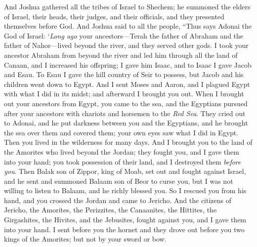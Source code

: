 \begin{biblechapter} %
 And Joshua gathered all the tribes of Israel to Shechem; he summoned the elders of Israel, their heads, their judges, and their officials, and they presented themselves before God.
\verse And Joshua said to all the people, “Thus says Adonai the God of Israel: ‘\textit{Long ago} your ancestors—Terah the father of Abraham and the father of Nahor—lived beyond the river, and they served other gods.
\verse I took your ancestor Abraham from beyond the river and led him through all the land of Canaan, and I increased his offspring; I gave him Isaac,
\verse and to Isaac I gave Jacob and Esau. To Esau I gave the hill country of Seir to possess, but Jacob and his children went down to Egypt.
\verse And I sent Moses and Aaron, and I plagued Egypt with what I did in its midst; and afterward I brought you out.
\verse When I brought out your ancestors from Egypt, you came to the sea, and the Egyptians pursued after your ancestors with chariots and horsemen to the \textit{Red Sea}.
\verse They cried out to Adonai, and he put darkness between you and the Egyptians, and he brought the sea over them and covered them; your own eyes saw what I did in Egypt. Then you lived in the wilderness for many days.
\verse And I brought you to the land of the Amorites who lived beyond the Jordan; they fought you, and I gave them into your hand; you took possession of their land, and I destroyed them \textit{before you}.
\verse Then Balak son of Zippor, king of Moab, set out and fought against Israel, and he sent and summoned Balaam son of Beor to curse you,
\verse but I was not willing to listen to Balaam, and he richly blessed you. So I rescued you from his hand,
\verse and you crossed the Jordan and came to Jericho. And the citizens of Jericho, the Amorites, the Perizzites, the Canaanites, the Hittites, the Girgashites, the Hivites, and the Jebusites, fought against you, and I gave them into your hand.
\verse I sent before you the hornet and they drove out before you two kings of the Amorites; but not by your sword or bow.

\end{biblechapter}
